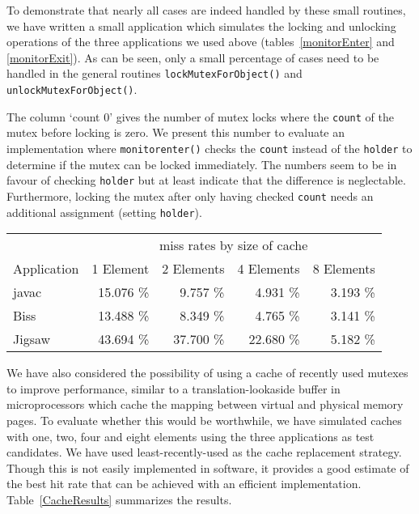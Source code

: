 To demonstrate that nearly all cases are indeed handled by these small
routines, we have written a small application which simulates the
locking and unlocking operations of the three applications we used
above (tables~\ref{monitorEnter} and \ref{monitorExit}). As can be
seen, only a small percentage of cases need to be handled in the
general routines \texttt{lockMutexForObject()} and
\texttt{unlockMutexForObject()}.

The column `count 0' gives the number of mutex locks where the {\tt count}
of the mutex before locking is zero. We present this number to evaluate an
implementation where {\tt monitorenter()} checks the {\tt count} instead of
the {\tt holder} to determine if the mutex can be locked immediately. The
numbers seem to be in favour of checking {\tt holder} but at least indicate
that the difference is neglectable. Furthermore, locking the mutex after
only having checked {\tt count} needs an additional assignment (setting
{\tt holder}).

\begin{table*}
\begin{center}
\begin{tabular}{|l|r|r|r|r|} \hline
            & \multicolumn{4}{|c|}{miss rates by size of cache} \\
Application & 1 Element & 2 Elements & 4 Elements & 8 Elements \\
\hline\hline
javac       & 15.076 \% &  9.757 \% &  4.931 \% & 3.193 \% \\ \hline
Biss        & 13.488 \% &  8.349 \% &  4.765 \% & 3.141 \% \\ \hline
Jigsaw      & 43.694 \% & 37.700 \% & 22.680 \% & 5.182 \% \\ \hline
\end{tabular}
\caption{Results of cache simulation}
\label{CacheResults}
\end{center}
\end{table*}

We have also considered the possibility of using a cache of recently
used mutexes to improve performance, similar to a
translation-lookaside buffer in microprocessors which cache the
mapping between virtual and physical memory pages. To evaluate whether
this would be worthwhile, we have simulated caches with one, two, four
and eight elements using the three applications as test candidates. We
have used least-recently-used as the cache replacement strategy.
Though this is not easily implemented in software, it provides a good
estimate of the best hit rate that can be achieved with an efficient
implementation.  Table~\ref{CacheResults} summarizes the results.

